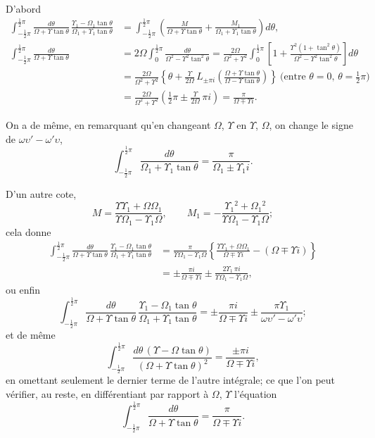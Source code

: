 \documentclass[11pt,a4paper]{book}
\begin{document}
D'abord
\begin{align*}
\int_{-\frac{1}{2}\pi}^{\frac{1}{2}\pi} \frac{d\theta}{\Omega + \Upsilon\tan\theta}\, \frac{\Upsilon_1 - \Omega_1\tan\theta}{\Omega_1 + \Upsilon_1\tan\theta}
&= \int_{-\frac{1}{2}\pi}^{\frac{1}{2}\pi} \left(\frac{M}{\Omega + \Upsilon\tan\theta} + \frac{M_1}{\Omega_1 + \Upsilon_1\tan\theta}\right) d\theta,\\
\int_{-\frac{1}{2}\pi}^{\frac{1}{2}\pi} \frac{d\theta}{\Omega + \Upsilon\tan\theta}
&= 2\Omega \int_0^{\frac{1}{2}\pi} \frac{d\theta}{\Omega^2 - \Upsilon^2\tan^2\theta}
= \frac{2\Omega}{\Omega^2 + \Upsilon^2} \int_0^{\frac{1}{2}\pi} \left[1 + \frac{\Upsilon^2(1 + \tan^2\theta)}{\Omega^2 - \Upsilon^2\tan^2\theta}\right] d\theta\\
&= \frac{2\Omega}{\Omega^2 + \Upsilon^2} \left\{\theta + \frac{\Upsilon}{2\Omega}\, L_{\pm\pi i}\left(\frac{\Omega + \Upsilon\tan\theta}{\Omega - \Upsilon\tan\theta}\right)\right\}\ \text{(entre $\theta = 0$, $\theta = \tfrac{1}{2}\pi$)}\\
&= \frac{2\Omega}{\Omega^2 + \Upsilon^2} \left(\tfrac{1}{2}\pi \pm \frac{\Upsilon}{2\Omega}\, \pi i\right) = \frac{\pi}{\Omega \mp \Upsilon i}.
\end{align*}

On a de m\^eme, en remarquant qu'en changeant $\Omega$, $\Upsilon$ en $\Upsilon$, $\Omega$, on change le signe
de $\omega\upsilon' - \omega'\upsilon$,
\[\int_{-\frac{1}{2}\pi}^{\frac{1}{2}\pi} \frac{d\theta}{\Omega_1 + \Upsilon_1\tan\theta} = \frac{\pi}{\Omega_1 \pm \Upsilon_1 i}.\]

D'un autre cote,
\[M = \frac{\Upsilon\Upsilon_1 + \Omega\Omega_1}{\Upsilon\Omega_1 - \Upsilon_1\Omega},\qquad
M_1 = -\frac{\Upsilon_1{}^2 + \Omega_1{}^2}{\Upsilon\Omega_1 - \Upsilon_1\Omega};\]
cela donne
\begin{align*}
\int_{-\frac{1}{2}\pi}^{\frac{1}{2}\pi} \frac{d\theta}{\Omega + \Upsilon\tan\theta}\, \frac{\Upsilon_1 - \Omega_1\tan\theta}{\Omega_1 + \Upsilon_1\tan\theta}
&= \frac{\pi}{\Upsilon\Omega_1 - \Upsilon_1\Omega} \left\{\frac{\Upsilon\Upsilon_1 + \Omega\Omega_1}{\Omega \mp \Upsilon i} - (\Omega \mp \Upsilon i)\right\}\\
&= \pm \frac{\pi i}{\Omega \mp \Upsilon i} \pm \frac{2\Upsilon_1\, \pi i}{\Upsilon\Omega_1 - \Upsilon_1\Omega},
\end{align*}
ou enfin
\[\int_{-\frac{1}{2}\pi}^{\frac{1}{2}\pi} \frac{d\theta}{\Omega + \Upsilon\tan\theta}\, \frac{\Upsilon_1 - \Omega_1\tan\theta}{\Omega_1 + \Upsilon_1\tan\theta}
= \pm \frac{\pi i}{\Omega \mp \Upsilon i} \pm \frac{\pi\Upsilon_1}{\omega\upsilon' - \omega'\upsilon};\]
et de m\^eme
\[\int_{-\frac{1}{2}\pi}^{\frac{1}{2}\pi} \frac{d\theta\, (\Upsilon - \Omega\tan\theta)}{(\Omega + \Upsilon\tan\theta)^2}
= \frac{\pm \pi i}{\Omega \mp \Upsilon i},\]
en omettant seulement le dernier terme de l'autre int\'egrale; ce que l'on peut v\'erifier,
au reste, en diff\'erentiant par rapport \`a $\Omega$, $\Upsilon$ l'\'equation
\[\int_{-\frac{1}{2}\pi}^{\frac{1}{2}\pi} \frac{d\theta}{\Omega + \Upsilon\tan\theta} = \frac{\pi}{\Omega \mp \Upsilon i}.\]
\end{document}
